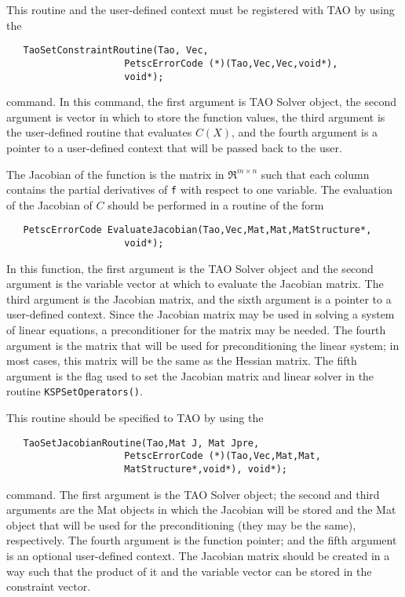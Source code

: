 This routine and the user-defined context 
must be registered with TAO by using the
\begin{verbatim}
   TaoSetConstraintRoutine(Tao, Vec,
                     PetscErrorCode (*)(Tao,Vec,Vec,void*),
                     void*);
\end{verbatim}
command. 
\noindent
In this command, the first argument is TAO Solver object,
the second argument is vector in which to store the function values,
the third argument is the user-defined routine that evaluates $C(X)$,
and the fourth argument is a pointer to a user-defined context that will
be passed back to the user.

The Jacobian of the function is the matrix in $\Re^{m \times n}$
such that each column contains the partial derivatives of {\tt f} with respect
to one variable. 
The evaluation of the Jacobian of $C$ should be performed in a routine
of the form
\begin{verbatim}
   PetscErrorCode EvaluateJacobian(Tao,Vec,Mat,Mat,MatStructure*,
                     void*);
\end{verbatim}
\noindent
In this function, the first argument is the TAO Solver object and the 
second argument is the variable vector at which to evaluate the 
Jacobian matrix. The third argument is the Jacobian matrix,
and the sixth argument is a pointer to a user-defined context.
Since the Jacobian matrix may be used in solving a system of linear equations,
a preconditioner for the matrix may be needed.  The fourth argument is the matrix that will be used
for preconditioning the linear system; in most cases, this
matrix will be the same as the Hessian matrix.  The fifth
argument is the flag used to set the Jacobian matrix and
linear solver in the routine {\tt KSPSetOperators()}.

This routine should be specified to TAO by using the
\begin{verbatim}
   TaoSetJacobianRoutine(Tao,Mat J, Mat Jpre,
                     PetscErrorCode (*)(Tao,Vec,Mat,Mat, 
                     MatStructure*,void*), void*);
\end{verbatim}
\noindent
command.
The first argument is the TAO Solver object; the second
and third arguments are the Mat objects in which the Jacobian will be stored
and the Mat object that will be used for the preconditioning (they may
be the same), respectively. 
The fourth argument is the function pointer; and the fifth argument is
an optional user-defined context.
The Jacobian matrix should be created in a way such that the product of 
it and the variable vector can be stored in the constraint vector.

